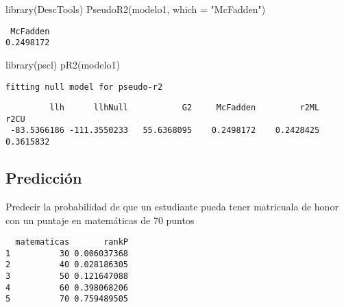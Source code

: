 \documentclass[
]{article}
\newenvironment{Shaded}{\begin{snugshade}}{\end{snugshade}}
\newcommand{\AttributeTok}[1]{\textcolor[rgb]{0.77,0.63,0.00}{#1}}
\newcommand{\DecValTok}[1]{\textcolor[rgb]{0.00,0.00,0.81}{#1}}
\newcommand{\FunctionTok}[1]{\textcolor[rgb]{0.00,0.00,0.00}{#1}}
\newcommand{\NormalTok}[1]{#1}
\newcommand{\OtherTok}[1]{\textcolor[rgb]{0.56,0.35,0.01}{#1}}
\newcommand{\SpecialCharTok}[1]{\textcolor[rgb]{0.00,0.00,0.00}{#1}}
\newcommand{\StringTok}[1]{\textcolor[rgb]{0.31,0.60,0.02}{#1}}
\begin{document}
\begin{Shaded}
\begin{Highlighting}[]
\FunctionTok{library}\NormalTok{(DescTools)}
\FunctionTok{PseudoR2}\NormalTok{(modelo1, }\AttributeTok{which =} \StringTok{"McFadden"}\NormalTok{)}
\end{Highlighting}
\end{Shaded}

\begin{verbatim}
 McFadden 
0.2498172 
\end{verbatim}

\begin{Shaded}
\begin{Highlighting}[]
\FunctionTok{library}\NormalTok{(pscl)}
\FunctionTok{pR2}\NormalTok{(modelo1)}
\end{Highlighting}
\end{Shaded}

\begin{verbatim}
fitting null model for pseudo-r2
\end{verbatim}

\begin{verbatim}
         llh      llhNull           G2     McFadden         r2ML         r2CU 
 -83.5366186 -111.3550233   55.6368095    0.2498172    0.2428425    0.3615832 
\end{verbatim}

\hypertarget{predicciuxf3n}{%
\subsection{Predicción}\label{predicciuxf3n}}

Predecir la probabilidad de que un estudiante pueda tener matricuala de
honor con un puntaje en matemáticas de 70 puntos

\begin{Shaded}
\end{Shaded}

\begin{verbatim}
  matematicas       rankP
1          30 0.006037368
2          40 0.028186305
3          50 0.121647088
4          60 0.398068206
5          70 0.759489505
\end{verbatim}
\end{document}
